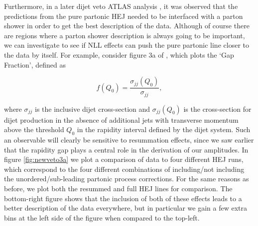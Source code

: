 Furthermore, in a later dijet veto ATLAS analysis \cite{Aad2014}, it was observed that the predictions from the pure partonic HEJ needed to be interfaced with a parton shower in order to get the best description of the data. Although of course there are regions where a parton shower description is always going to be important, we can investigate to see if NLL effects can push the pure partonic line closer to the data by itself. For example, consider figure 3a of \cite{Aad2014}, which plots the `Gap Fraction', defined as

\begin{equation}
f(Q_0) = \frac{\sigma_{jj}(Q_0)}{\sigma_{jj}},
\end{equation}

where $\sigma_{jj}$ is the inclusive dijet cross-section and $\sigma_{jj}(Q_0)$ is the cross-section for dijet production in the absence of additional jets with transverse momentum above the threshold $Q_0$ in the rapidity interval defined by the dijet system. Such an observable will clearly be sensitive to resummation effects, since we saw earlier that the rapidity gap plays a central role in the derivation of our amplitudes. In figure \ref{fig:newveto3a} we plot a comparison of data to four different HEJ runs, which correspond to the four different combinations of including/not including the unordered/sub-leading partonic process corrections. For the same reasons as before, we plot both the resummed and full HEJ lines for comparison. The bottom-right figure shows that the inclusion of both of these effects leads to a better description of the data everywhere, but in particular we gain a few extra bins at the left side of the figure when compared to the top-left.

